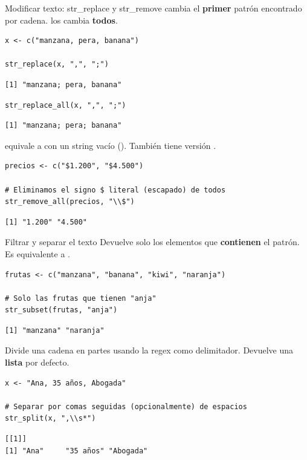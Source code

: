 \documentclass[8pt]{beamer}
\begin{document}
\begin{frame}[fragile]{Modificar texto: str\_replace y str\_remove}
	 cambia el \textbf{primer} patrón encontrado por cadena.  los cambia \textbf{todos}.
\begin{lstlisting}[style=RScript]
x <- c("manzana, pera, banana")

str_replace(x, ",", ";")
\end{lstlisting}
\begin{lstlisting}[style=RConsole]
[1] "manzana; pera, banana"
\end{lstlisting}
\begin{lstlisting}[style=RScript]
str_replace_all(x, ",", ";")
\end{lstlisting}
\begin{lstlisting}[style=RConsole]
[1] "manzana; pera; banana"
\end{lstlisting}

	 equivale a  con un string vacío (). También tiene versión .
\begin{lstlisting}[style=RScript]
precios <- c("$1.200", "$4.500")

# Eliminamos el signo $ literal (escapado) de todos
str_remove_all(precios, "\\$")
\end{lstlisting}
\begin{lstlisting}[style=RConsole]
[1] "1.200" "4.500"
\end{lstlisting}
\end{frame}




\begin{frame}[fragile]{Filtrar y separar el texto}
	Devuelve solo los elementos que \textbf{contienen} el patrón. Es equivalente a .
\begin{lstlisting}[style=RScript]
frutas <- c("manzana", "banana", "kiwi", "naranja")

# Solo las frutas que tienen "anja"
str_subset(frutas, "anja")
\end{lstlisting}
\begin{lstlisting}[style=RConsole]
[1] "manzana" "naranja"
\end{lstlisting}

	Divide una cadena en partes usando la regex como delimitador. Devuelve una \textbf{lista} por defecto.
\begin{lstlisting}[style=RScript]
x <- "Ana, 35 años, Abogada"

# Separar por comas seguidas (opcionalmente) de espacios
str_split(x, ",\\s*")
\end{lstlisting}
\begin{lstlisting}[style=RConsole]
[[1]]
[1] "Ana"     "35 años" "Abogada"
\end{lstlisting}
\end{frame}
\end{document}
